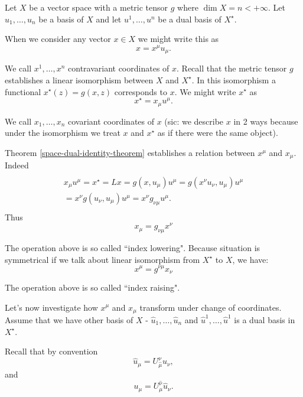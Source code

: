 \documentclass[main.tex]{subfiles}
\begin{document}
Let $X$ be a vector space with a metric tensor $g$ where $\dim X = n < +\infty$. Let $u_1, \dots, u_n$ be a basis of $X$ and let $u^1, \dots, u^n$ be a dual basis of $X^\star$.

When we consider any vector $x\in X$ we might write this as
\begin{equation}
x = x^\mu u_\mu.
\end{equation}

We call $x^1, \dots, x^n$ contravariant coordinates of $x$. Recall that the metric tensor $g$ establishes a linear isomorphism between $X$ and $X^\star$. In this isomorphism a functional $x^\star(z) = g(x, z)$ corresponds to $x$. We might write $x^\star$ as
\begin{equation}
\label{functional-covariant-respresentation}
x^\star = x_\mu u^\mu.
\end{equation}

We call $x_1, \dots, x_n$ covariant coordinates of $x$ (sic: we describe $x$ in 2 ways because under the isomorphism we treat $x$ and $x^\star$ as if there were the same object).

Theorem \ref{space-dual-identity-theorem} establishes a relation between $x^\mu$ and $x_\mu$. Indeed
\begin{multline*}
\\
x_\mu u^\mu = x^\star = Lx = 
g(x, u_\mu) u^\mu = 
g(x^\nu u_\nu, u_\mu)u^\mu 
\\= x^\nu g(u_\nu, u_\mu)u^\mu = x^\nu g_{\nu\mu} u^\mu.
\\
\end{multline*}
Thus
\begin{equation}
\boxed{
x_\mu = g_{\nu\mu} x^\nu}
\end{equation}

The operation above is so called ``index lowering". Because situation is symmetrical if we talk about linear isomorphism from $X^\star$ to $X$, we have:
\begin{equation}
\boxed{
x^\mu = g^{\nu\mu} x_\nu}
\end{equation}

The operation above is so called ``index raising". 


Let's now investigate how $x^\mu$ and $x_\mu$ transform under change of coordinates. Assume that we have other basis of $X$ - $\hat{u}_1, \dots, \hat{u}_n$ and $\hat{u}^1, \dots, \hat{u}^1$ is a dual basis in $X^\star$.

Recall that by convention 
\begin{equation}
\hat{u}_\mu = U^{\nu}_{\hat{\mu}} u_\nu,
\end{equation}
and
\begin{equation}
u_\mu =  U^{\hat{\nu}}_\mu  \hat{u}_\nu.
\end{equation}
\end{document}
